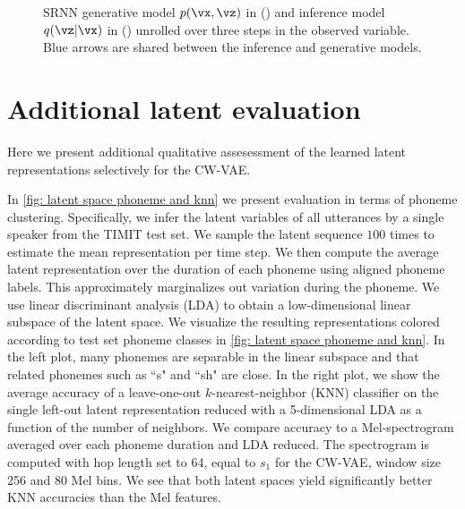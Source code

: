 {\begin{figure}[t!]
\begin{subfigure}[b]{0.48\textwidth}
    \caption{}
    \label{fig: srnn graphical model inference}
    \end{subfigure}
\caption{
    SRNN \cite{fraccaro_sequential_2016} generative model $p(\vx,\vz)$ in () and inference model $q(\vz|\vx)$ in () unrolled over three steps in the observed variable. 
    Blue arrows are shared between the inference and generative models.
}
\label{fig: srnn graphical models (inference and generative)}
\end{figure}




\section{Additional latent evaluation}\label{app: additional latent space clustering}
Here we present additional qualitative assesessment of the learned latent representations selectively for the CW-VAE. 

In \cref{fig: latent space phoneme and knn} we present evaluation in terms of phoneme clustering. 
Specifically, we infer the latent variables of all utterances by a single speaker from the TIMIT test set. We sample the latent sequence $100$ times to estimate the mean representation per time step. We then compute the average latent representation over the duration of each phoneme using aligned phoneme labels. This approximately marginalizes out variation during the phoneme. We use linear discriminant analysis (LDA) \cite{fisher_use_1936} to obtain a low-dimensional linear subspace of the latent space. 
We visualize the resulting representations colored according to test set phoneme classes in \cref{fig: latent space phoneme and knn}. 
In the left plot, many phonemes are separable in the linear subspace and that related phonemes such as ``s" and ``sh" are close. 
In the right plot, we show the average accuracy of a leave-one-out $k$-nearest-neighbor (KNN) classifier on the single left-out latent representation reduced with a 5-dimensional LDA as a function of the number of neighbors. 
We compare accuracy to a Mel-spectrogram averaged over each phoneme duration and LDA reduced. The spectrogram is computed with hop length set to 64, equal to $s_1$ for the CW-VAE, window size 256 and 80 Mel bins.
We see that both latent spaces yield significantly better KNN accuracies than the Mel features.

}
